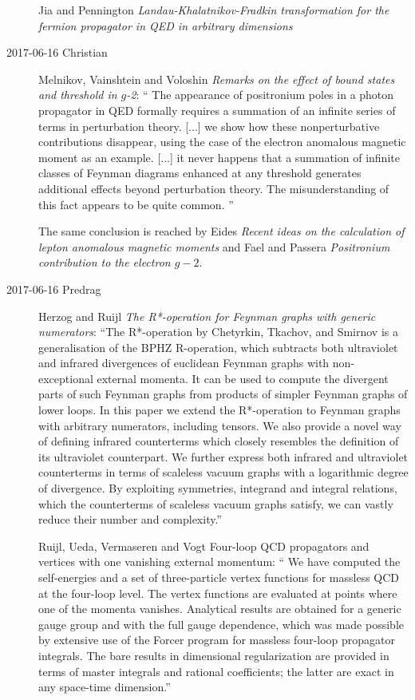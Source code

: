 \begin{description}
Jia and Pennington
{\em Landau-Khalatnikov-Fradkin transformation for the fermion propagator
in QED in arbitrary dimensions}

\item[2017-06-16 Christian]
Melnikov, Vainshtein and Voloshin
{\em Remarks on the effect of bound states and threshold in $g$-2}:
``
The appearance of positronium poles in a photon propagator in QED
formally requires a summation of an infinite series of terms in
perturbation theory. [...] we show how these nonperturbative
contributions disappear, using the case of the electron anomalous
magnetic moment as an example. [...] it never happens that a summation of
infinite classes of Feynman diagrams enhanced at any threshold generates
additional effects beyond perturbation theory. The misunderstanding of
this fact appears to be quite common.
''

The same conclusion is reached by
Eides
{\em Recent ideas on the calculation of lepton anomalous magnetic moments}
and
Fael and Passera
{\em Positronium contribution to the electron {$g-2$}}.

\item[2017-06-16 Predrag]
Herzog and Ruijl
{\em The {R*}-operation for {Feynman} graphs with generic numerators}:
``The R*-operation by Chetyrkin, Tkachov, and Smirnov is a generalisation
of the BPHZ R-operation, which subtracts both ultraviolet and infrared
divergences of euclidean Feynman graphs with non-exceptional external
momenta. It can be used to compute the divergent parts of such Feynman
graphs from products of simpler Feynman graphs of lower loops. In this
paper we extend the R*-operation to Feynman graphs with arbitrary
numerators, including tensors. We also provide a novel way of defining
infrared counterterms which closely resembles the definition of its
ultraviolet counterpart. We further express both infrared and ultraviolet
counterterms in terms of scaleless vacuum graphs with a logarithmic
degree of divergence. By exploiting symmetries, integrand and integral
relations, which the counterterms of scaleless vacuum graphs satisfy, we
can vastly reduce their number and complexity.''

Ruijl, Ueda, Vermaseren and Vogt {Four-loop {QCD}
propagators and vertices with one vanishing external momentum}: `` We
have computed the self-energies and a set of three-particle vertex
functions for massless QCD at the four-loop level. The vertex functions
are evaluated at points where one of the momenta vanishes. Analytical
results are obtained for a generic gauge group and with the full gauge
dependence, which was made possible by extensive use of the Forcer
program for massless four-loop propagator integrals. The bare results
in dimensional regularization are provided in terms of master integrals
and rational coefficients; the latter are exact in any space-time
dimension.''


\end{description}
